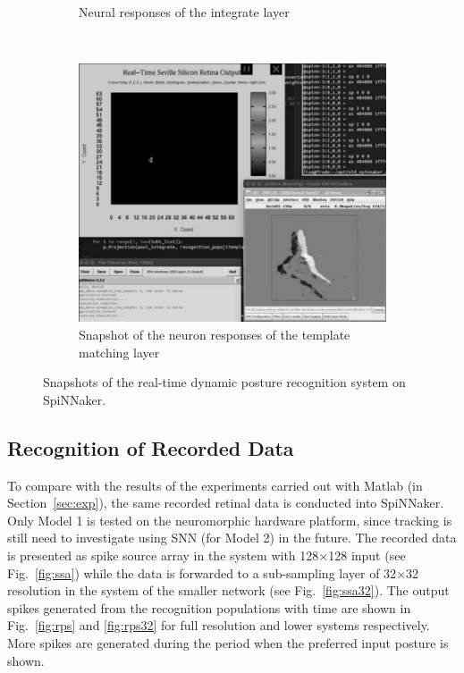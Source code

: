 \begin{figure}
\begin{subfigure}[t]{0.48\textwidth}
		\caption{Neural responses of the integrate layer~\cite{video2}}
	    \label{fig:live2}
	\end{subfigure}
	\\
	\begin{subfigure}[t]{0.80\textwidth}
		\includegraphics[width=\textwidth]{pics_icann/live.png}
		\caption{Snapshot of the neuron responses of the template matching layer~\cite{video3}}
	    \label{fig:live3}
	\end{subfigure}	

\caption{Snapshots of the real-time dynamic posture recognition system on SpiNNaker.
}
\label{fig:live}
\end{figure}

\subsection{Recognition of Recorded Data}
To compare with the results of the experiments carried out with Matlab (in Section~\ref{sec:exp}), the same recorded retinal data is conducted into SpiNNaker.
Only Model 1 is tested on the neuromorphic hardware platform, since tracking is still need to investigate using SNN (for Model 2) in the future. 
The recorded data is presented as spike source array in the system with 128$\times$128 input (see Fig.~\ref{fig:ssa}) while the data is forwarded to a sub-sampling layer of 32$\times$32 resolution in the system of the smaller network (see Fig.~\ref{fig:ssa32}). 
The output spikes generated from the recognition populations with time are shown in Fig.~\ref{fig:rps} and \ref{fig:rps32} for full resolution and lower systems respectively. 
More spikes are generated during the period when the preferred input posture is shown. 


